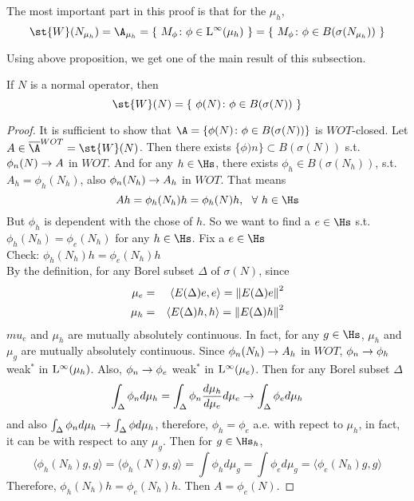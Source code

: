 \begin{rem}
	The most important part in this proof is that for the $\mu_h$,
	\begin{equation*}
		\st{W}(N_{\mu_h}) = \A_{\mu_h} = \{~M_{\phi} \colon \phi \in \lfs{\infty}(\mu_h)~\} = \{~M_{\phi} \colon \phi \in B(\sigma(N_{\mu_h}))~\}
	\end{equation*}
\end{rem}

Using above proposition, we get one of the main result of this subsection.

\begin{thm}
	If $N$ is a normal operator, then 
	\begin{equation*}
		\st{W}(N) = \{~\phi(N) \colon \phi \in B(\sigma(N))~\}
	\end{equation*}
\end{thm}
\begin{proof}
	It is sufficient to show that $\A = \{\phi(N) \colon \phi \in B(\sigma(N))\}$ is $WOT$-closed. Let $A \in \clo{\A}^{WOT} = \st{W}(N)$. Then there exists $\{\phi)n\} \subset B(\sigma(N))$ s.t. $\phi_n(N) \rightarrow A$ in $WOT$. And for any $h \in \Hs$, there exists $\phi_h \in B(\sigma(N_h))$, s.t. $A_h = \phi_h(N_h)$, also $\phi_n(N_h) \rightarrow A_h$ in $WOT$. That means 
	\begin{equation*}
		Ah = \phi_h(N_h)h = \phi_h(N)h,~~\forall~h \in \Hs
	\end{equation*}
	But $\phi_h$ is dependent with the chose of $h$. So we want to find a $e \in \Hs$ s.t. $\phi_h(N_h) = \phi_e(N_h)$ for any $h \in \Hs$. Fix a $e \in \Hs$ \\
	Check: $\phi_h(N_h)h = \phi_e(N_h)h$ \\
	By the definition, for any Borel subset $\Delta$ of $\sigma(N)$, since
	\begin{eqnarray*}
		\mu_e &=& \langle E(\Delta)e,e \rangle = \left\lVert E(\Delta)e\right\lVert^2 \\
		\mu_h &=& \langle E(\Delta)h,h \rangle = \left\lVert E(\Delta)h\right\lVert^2
	\end{eqnarray*}
	$mu_e$ and $\mu_h$ are mutually absolutely continuous. In fact, for any $g \in \Hs$, $\mu_h$ and $\mu_g$ are mutually absolutely continuous. Since $\phi_n(N_h) \rightarrow A_h$ in $WOT$, $\phi_n \rightarrow \phi_h$ weak$^{*}$ in $\mathrm{L^{\infty}}(\mu_h)$. Also, $\phi_n \rightarrow \phi_e$ weak$^{*}$ in $\mathrm{L^{\infty}}(\mu_e)$. Then for any Borel subset $\Delta$
	\begin{equation*}
		\int_{\Delta} \phi_n d\mu_h = \int_{\Delta} \phi_n \frac{d\mu_h}{d\mu_e}d\mu_e \rightarrow \int_{\Delta} \phi_e d\mu_h
	\end{equation*}
	and also $\int_{\Delta} \phi_n d\mu_h \rightarrow \int_{\Delta} \phi d\mu_h$, therefore, $\phi_h = \phi_e$ a.e. with repect to $\mu_h$, in fact, it can be with respect to any $\mu_g$. Then for $g \in \Hs_h$,
	\begin{equation*}
		\langle \phi_h(N_h)g,g \rangle = \langle \phi_h(N)g,g \rangle = \int \phi_h d\mu_g = \int \phi_e d\mu_g = \langle \phi_e(N_h)g,g \rangle
	\end{equation*}
	Therefore, $\phi_h(N_h)h = \phi_e(N_h)h$. Then $A = \phi_e(N)$.
\end{proof} 

